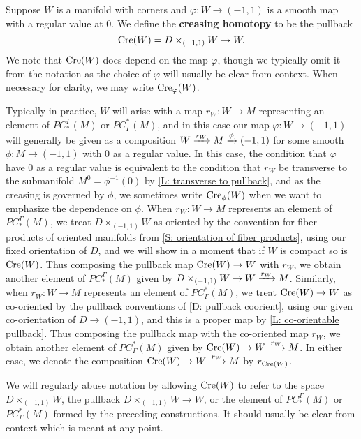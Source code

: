 \begin{definition}
	Suppose $W$ is a manifold with corners and $\varphi \colon W \to (-1,1)$ is a smooth map with a regular value at $0$.
	We define the \textbf{creasing homotopy} to be the pullback
	\[
	\mathrm{Cre}(W) = D\times_{(-1,1)} W \to W.
	\]
	We note that $\mathrm{Cre}(W)$ does depend on the map $\varphi$, though we typically omit it from the notation as the choice of $\varphi$ will usually be clear from context.
	When necessary for clarity, we may write $\mathrm{Cre}_\varphi(W)$.

	Typically in practice, $W$ will arise with a map $r_W \colon W \to M$ representing an element of $PC_*^\Gamma(M)$ or $PC^*_\Gamma(M)$, and in this case our map $\varphi \colon W \to (-1,1)$ will generally be given as a composition $W \xrightarrow{r_W}M \xrightarrow{\phi} (-1,1)$ for some smooth $\phi \colon M \to (-1,1)$ with $0$ as a regular value.
	In this case, the condition that $\varphi$ have $0$ as a regular value is equivalent to the condition that $r_W$ be transverse to the submanifold $M^0 = \phi^{-1}(0)$ by \cref{L: transverse to pullback}, and as the creasing is governed by $\phi$, we sometimes write $\mathrm{Cre}_\phi(W)$ when we want to emphasize the dependence on $\phi$.
	When $r_W \colon W \to M$ represents an element of $PC_*^\Gamma(M)$, we treat $D\times_{(-1,1)} W$ as oriented by the convention for fiber products of oriented manifolds from \cref{S: orientation of fiber products}, using our fixed orientation of $D$, and we will show in a moment that if $W$ is compact so is $\mathrm{Cre}(W)$.
	Thus composing the pullback map $\mathrm{Cre}(W) \to W$ with $r_W$, we obtain another element of $PC_*^\Gamma(M)$ given by $D\times_{(-1,1)} W \to W \xrightarrow{r_W}M$.
	Similarly, when $r_W \colon W \to M$ represents an element of $PC^*_\Gamma(M)$, we treat $\mathrm{Cre}(W) \to W$ as co-oriented by the pullback conventions of \cref{D: pullback coorient}, using our given co-orientation of $D \to (-1,1)$, and this is a proper map by \cref{L: co-orientable pullback}.
	Thus composing the pullback map with the co-oriented map $r_W$, we obtain another element of $PC^*_\Gamma(M)$ given by $\mathrm{Cre}(W) \to W \xrightarrow{r_W} M$.
	In either case, we denote the composition $\mathrm{Cre}(W) \to W \xrightarrow{r_W}M$ by $r_{\mathrm{Cre}(W)}$.

	We will regularly abuse notation by allowing $\mathrm{Cre}(W)$ to refer to the space $D\times_{(-1,1)} W$, the pullback $D\times_{(-1,1)} W \to W$, or the element of $PC_*^\Gamma(M)$ or $PC^*_\Gamma(M)$ formed by the preceding constructions.
	It should usually be clear from context which is meant at any point.
\end{definition}

